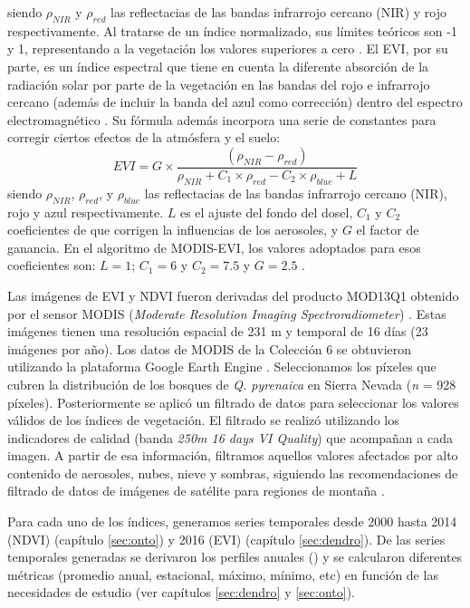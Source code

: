 siendo \(\rho_{NIR}\) y \(\rho_{red}\) las reflectacias de las bandas infrarrojo cercano (NIR) y rojo respectivamente. Al tratarse de un índice normalizado, sus límites teóricos son -1 y 1, representando a la
vegetación los valores superiores a cero \autocites{Hueteetal2002OverviewRadiometric}. El EVI, por su parte, es un índice espectral que tiene en cuenta la diferente absorción de la radiación solar por parte de la vegetación en las bandas del rojo e infrarrojo cercano (además de incluir la banda del azul como corrección)
dentro del espectro electromagnético \autocites{Hueteetal2002OverviewRadiometric}. Su fórmula además incorpora una serie de constantes para corregir ciertos efectos de la atmósfera y el suelo:
\[EVI = G\times\frac{(\rho_{NIR}-\rho_{red})}{\rho_{NIR} + C_{1} \times \rho_{red} - C_{2}\times \rho_{blue} + L}\]
siendo \(\rho_{NIR}\), \(\rho_{red}\), y \(\rho_{blue}\) las reflectacias de las bandas infrarrojo cercano (NIR), rojo y azul respectivamente. \(L\) es el ajuste del fondo del dosel, \(C_{1}\) y \(C_{2}\) coeficientes de que corrigen la influencias de los aerosoles, y \(G\) el factor de ganancia. En el algoritmo de MODIS-EVI, los valores adoptados para esos coeficientes son: \(L = 1\); \(C_{1} = 6\) y \(C_{2}=7.5\) y \(G = 2.5\) \autocites{Hueteetal2002OverviewRadiometric}.

Las imágenes de EVI y NDVI fueron derivadas del producto MOD13Q1 obtenido por el sensor MODIS (\emph{Moderate Resolution Imaging Spectroradiometer}) \autocites{Didan2015MOD13Q1MODIS}. Estas imágenes tienen una resolución espacial de 231 m y temporal de 16 días (23 imágenes por año). Los datos de MODIS de la Colección 6 se obtuvieron utilizando la plataforma Google Earth Engine \autocites{Gorelicketal2017GoogleEarth}. Seleccionamos los píxeles que cubren la distribución de los bosques de \emph{Q. pyrenaica} en Sierra Nevada (\emph{n} = 928 píxeles). Posteriormente se aplicó un filtrado de datos para seleccionar los valores válidos de los índices de vegetación. El filtrado se realizó utilizando los indicadores de calidad (banda \emph{250m 16 days VI Quality}) que acompañan a cada imagen. A partir de esa información, filtramos aquellos valores afectados por alto contenido de aerosoles, nubes, nieve y sombras, siguiendo las recomendaciones de filtrado de datos de imágenes de satélite para regiones de montaña \autocites{ReyesDiezetal2015ImplicacionesFiltrado}.

Para cada uno de los índices, generamos series temporales desde 2000 hasta 2014 (NDVI) (capítulo \ref{sec:onto}) y 2016 (EVI) (capítulo \ref{sec:dendro}). De las series temporales generadas se derivaron los perfiles anuales () y se calcularon diferentes métricas (promedio anual, estacional, máximo, mínimo, etc) en función de las necesidades de estudio (ver capítulos \ref{sec:dendro} y \ref{sec:onto}). 


